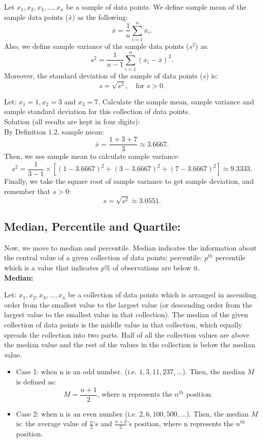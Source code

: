 \begin{definition}
	Let $x_1, x_2, x_3, ..., x_n$ be a sample of data points. We define sample mean of the sample data points ($\bar{x}$) as the following: 
	$$ \bar{x} = \frac{1}{n} \sum_{i=1}^{n} x_i. $$
	Also, we define sample variance of the sample data points ($s^2$) as: \[ s^2 = \frac{1}{n-1} \sum_{i=1}^{n}(x_i - \bar{x})^2.\] Moreover, the standard deviation of the sample of data points ($s$) is: \[ s = \sqrt{s^2}, \quad \text{for } s > 0.\]
\end{definition}
	
\begin{example}
Let: $x_1 = 1, x_2 = 3$ and $x_3 = 7$. Calculate the sample mean, sample variance and sample standard deviation for this collection of data points.\\


Solution (all results are kept in four digits):\\
By Definition $1.2$, sample mean: \[ \bar{x} = \frac{1+3+7}{3} \approx 3.6667.\]
Then, we use sample mean to calculate sample variance: \[ s^2 = \frac{1}{3-1} \times [(1-3.6667)^2+(3-3.6667)^2+(7-3.6667)^2] \approx 9.3333.\]
Finally, we take the square root of sample variance to get sample deviation, and remember that $s > 0$: \[ s = \sqrt{s^2} \approx 3.0551.\]

\end{example}

\subsection{Median, Percentile and Quartile:}
	
Now, we move to median and percentile. Median indicates the information about the central value of a given collection of data points; percentile: $p^{th} \text{ percentile}$ which is a value that indicates $p \%$ of observations are below it.\\

\textbf{Median:}

\begin{definition}
Let: $x_1, x_2, x_3, ... , x_n$ be a collection of data points which is arranged in ascending order from the smallest value to the largest value (or descending order from the largest value to the smallest value in that collection). The median of the given collection of data points is the middle value in that collection, which equally spreads the collection into two parts. Half of all the collection values are above the median value and the rest of the values in the collection is below the median value.
\begin{itemize}
	\item Case 1: when n is an odd number. (i.e. $1, 3, 11, 237,...$). Then, the median $M$ is defined as: \[ M = \frac{n+1}{2} \text{, where n represents the $n^{th}$ position}.\]
	\item Case 2: when n is an even number (i.e. $2, 6, 100, 500,...$). Then, the median $M$ is: the average value of $\frac{n}{2}$'s and $\frac{n+2}{2}$'s position, where n represents the $n^{th}$ position.
	\end{itemize}
\end{definition}

